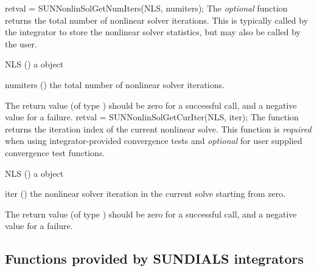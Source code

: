 {
  retval = SUNNonlinSolGetNumIters(NLS, numiters);
}
{
  The \textit{optional} function  returns
  the total number of nonlinear solver iterations. This is typically
  called by the {\sundials} integrator to store the nonlinear solver
  statistics, but may also be called by the user.
}
{
  \begin{args}[numiters]
  \item[NLS] ()
    a {\sunnonlinsol} object
  \item[numiters] ()
    the total number of nonlinear solver iterations.
  \end{args}
}
{
  The return value  (of type ) should be zero for a
  successful call, and a negative value for a failure.
}
{}
{
  retval = SUNNonlinSolGetCurIter(NLS, iter);
}
{
  The function  returns the iteration index
  of the current nonlinear solve. This function is \textit{required}
  when using {\sundials} integrator-provided convergence tests and
  \textit{optional} for user supplied convergence test functions.
}
{
  \begin{args}[numiters]
  \item[NLS] ()
    a {\sunnonlinsol} object
  \item[iter] ()
    the nonlinear solver iteration in the current solve starting from
    zero.
  \end{args}
}
{
  The return value  (of type ) should be zero for a
  successful call, and a negative value for a failure.
}
{}

\subsection{Functions provided by SUNDIALS integrators}
\label{ss:sunnonlinsol_sunsuppliedfn}

